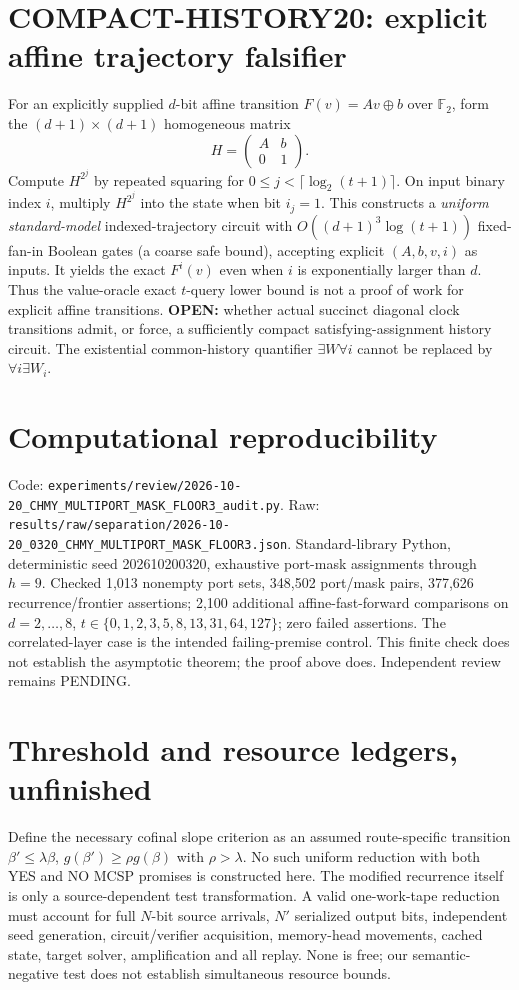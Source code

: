 \documentclass[11pt]{article}
\begin{document}
\section*{COMPACT-HISTORY20: explicit affine trajectory falsifier}
For an explicitly supplied $d$-bit affine transition $F(v)=Av\oplus b$ over $\mathbb F_2$, form the $(d+1)\times(d+1)$ homogeneous matrix
\[
 H=\begin{pmatrix}A&b\\0&1\end{pmatrix}.
\]
Compute $H^{2^j}$ by repeated squaring for $0\le j<\lceil\log_2(t+1)\rceil$. On input binary index $i$, multiply $H^{2^j}$ into the state when bit $i_j=1$. This constructs a \emph{uniform standard-model} indexed-trajectory circuit with $O((d+1)^3\log(t+1))$ fixed-fan-in Boolean gates (a coarse safe bound), accepting explicit $(A,b,v,i)$ as inputs. It yields the exact $F^i(v)$ even when $i$ is exponentially larger than $d$. Thus the value-oracle exact $t$-query lower bound is not a proof of work for explicit affine transitions. \textbf{OPEN:} whether actual succinct diagonal clock transitions admit, or force, a sufficiently compact satisfying-assignment history circuit. The existential common-history quantifier $\exists W\forall i$ cannot be replaced by $\forall i\exists W_i$.

\section*{Computational reproducibility}
Code: \texttt{experiments/review/2026-10-20\_CHMY\_MULTIPORT\_MASK\_FLOOR3\_audit.py}.
Raw: \texttt{results/raw/separation/2026-10-20\_0320\_CHMY\_MULTIPORT\_MASK\_FLOOR3.json}.
Standard-library Python, deterministic seed 202610200320, exhaustive port-mask assignments through $h=9$. Checked 1,013 nonempty port sets, 348,502 port/mask pairs, 377,626 recurrence/frontier assertions; 2,100 additional affine-fast-forward comparisons on $d=2,\ldots,8$, $t\in\{0,1,2,3,5,8,13,31,64,127\}$; zero failed assertions. The correlated-layer case is the intended failing-premise control. This finite check does not establish the asymptotic theorem; the proof above does. Independent review remains PENDING.

\section*{Threshold and resource ledgers, unfinished}
Define the necessary cofinal slope criterion as an assumed route-specific transition $\beta'\le\lambda\beta$, $g(\beta')\ge\rho g(\beta)$ with $\rho>\lambda$. No such uniform reduction with both YES and NO MCSP promises is constructed here. The modified recurrence itself is only a source-dependent test transformation. A valid one-work-tape reduction must account for full $N$-bit source arrivals, $N'$ serialized output bits, independent seed generation, circuit/verifier acquisition, memory-head movements, cached state, target solver, amplification and all replay. None is free; our semantic-negative test does not establish simultaneous resource bounds.
\end{document}
